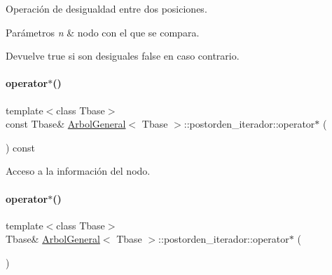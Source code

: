 Operación de desigualdad entre dos posiciones. 


\begin{DoxyParams}{Parámetros}
{\em n} & nodo con el que se compara. \\
\hline
\end{DoxyParams}
\begin{DoxyReturn}{Devuelve}
true si son desiguales false en caso contrario. 
\end{DoxyReturn}
\hypertarget{classArbolGeneral_1_1postorden__iterador_aa42543b192361b8ea90e115a0ed99cab}{}\label{classArbolGeneral_1_1postorden__iterador_aa42543b192361b8ea90e115a0ed99cab} 
\paragraph{\texorpdfstring{operator$\ast$()}{operator*()}\hspace{0.1cm}{\footnotesize\ttfamily [1/2]}}
{\footnotesize\ttfamily template$<$class Tbase$>$ \\
const Tbase\& \hyperlink{classArbolGeneral}{Arbol\+General}$<$ Tbase $>$\+::postorden\+\_\+iterador\+::operator$\ast$ (\begin{DoxyParamCaption}{ }\end{DoxyParamCaption}) const\hspace{0.3cm}{\ttfamily [inline]}}



Acceso a la información del nodo. 

\hypertarget{classArbolGeneral_1_1postorden__iterador_af0f0fcc363dd30b5b0d102c1b60817c3}{}\label{classArbolGeneral_1_1postorden__iterador_af0f0fcc363dd30b5b0d102c1b60817c3} 
\paragraph{\texorpdfstring{operator$\ast$()}{operator*()}\hspace{0.1cm}{\footnotesize\ttfamily [2/2]}}
{\footnotesize\ttfamily template$<$class Tbase$>$ \\
Tbase\& \hyperlink{classArbolGeneral}{Arbol\+General}$<$ Tbase $>$\+::postorden\+\_\+iterador\+::operator$\ast$ (\begin{DoxyParamCaption}{ }\end{DoxyParamCaption})\hspace{0.3cm}{\ttfamily [inline]}}

